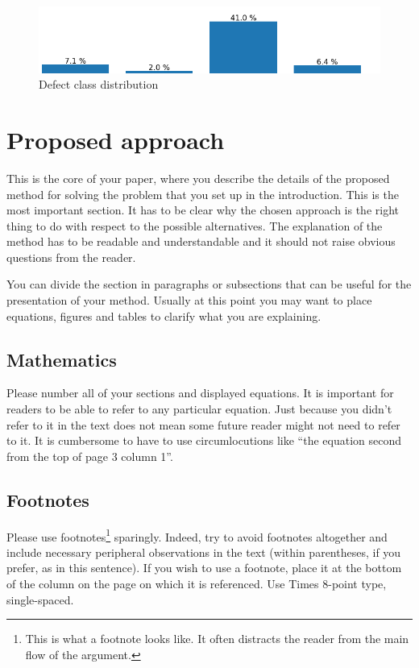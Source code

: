 \documentclass[10pt,twocolumn,letterpaper]{article}
\begin{document}
   \begin{figure}[h]
      \centering
      \caption{Defect class distribution} \label{fig:classImbalance}
      \includegraphics[scale=0.5]{Img_ClassImbalance}
   \end{figure}








\section{Proposed approach}
This is the core of your paper, where you describe the details of the proposed method for solving the problem that you set up in the introduction. This is the most important section. It has to be clear why the chosen approach is the right thing to do with respect to the possible alternatives. The explanation of the method has to be readable and understandable and it should not raise obvious questions from the reader. 

You can divide the section in paragraphs or subsections that can be useful for the presentation of your method. Usually at this point you may want to place equations, figures and tables to clarify what you are explaining.
\subsection{Mathematics}
Please number all of your sections and displayed equations.  It is
important for readers to be able to refer to any particular equation.  Just
because you didn't refer to it in the text does not mean some future reader
might not need to refer to it.  It is cumbersome to have to use
circumlocutions like ``the equation second from the top of page 3 column
1''. 
\subsection{Footnotes}
Please use footnotes\footnote {This is what a footnote looks like.  It
often distracts the reader from the main flow of the argument.} sparingly.
Indeed, try to avoid footnotes altogether and include necessary peripheral
observations in
the text (within parentheses, if you prefer, as in this sentence).  If you
wish to use a footnote, place it at the bottom of the column on the page on
which it is referenced. Use Times 8-point type, single-spaced.
\end{document}
